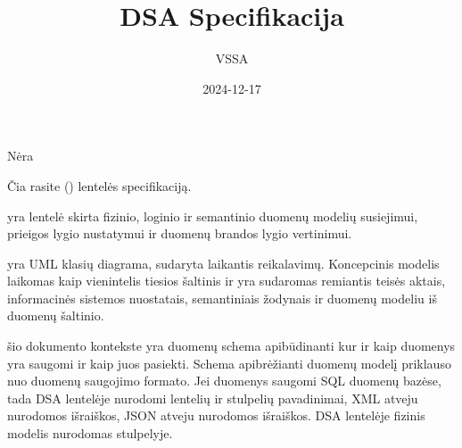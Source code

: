 \documentclass[letterpaper,10pt,lithuanian]{sphinxmanual}
\title{DSA Specifikacija}
\date{2024-12-17}
\author{VSSA}
\begin{document}
\pagestyle{empty}
\sphinxmaketitle
\pagestyle{plain}
\sphinxtableofcontents
\pagestyle{normal}
\label{\detokenize{index::doc}}

\begin{description}
\sphinxAtStartPar
{}

\sphinxAtStartPar
{}

\sphinxAtStartPar
{}

\sphinxAtStartPar
Nėra

\sphinxAtStartPar
{}

\sphinxAtStartPar
{}

\end{description}

\sphinxAtStartPar
Čia rasite  ({\hyperref[\detokenize{savokos:term-DSA}]{}}) lentelės specifikaciją.

\sphinxAtStartPar
{} yra lentelė skirta fizinio, loginio ir
semantinio duomenų modelių susiejimui, prieigos lygio nustatymui ir duomenų
brandos lygio vertinimui.

\noindent{}

\sphinxAtStartPar
{} yra UML klasių diagrama, sudaryta laikantis
 reikalavimų. Koncepcinis modelis laikomas
kaip vienintelis tiesios šaltinis ir yra sudaromas remiantis teisės aktais,
informacinės sistemos nuostatais, semantiniais žodynais ir duomenų modeliu iš
duomenų šaltinio.

\sphinxAtStartPar
{} šio dokumento kontekste yra duomenų schema apibūdinanti
kur ir kaip duomenys yra saugomi ir kaip juos pasiekti. Schema apibrėžianti
duomenų modelį priklauso nuo duomenų saugojimo formato. Jei duomenys saugomi
SQL duomenų bazėse, tada DSA lentelėje nurodomi lentelių ir stulpelių
pavadinimai, XML atveju nurodomos  išraiškos, JSON atveju nurodomos
 išraiškos. DSA lentelėje fizinis modelis nurodomas 
stulpelyje.
\end{document}
